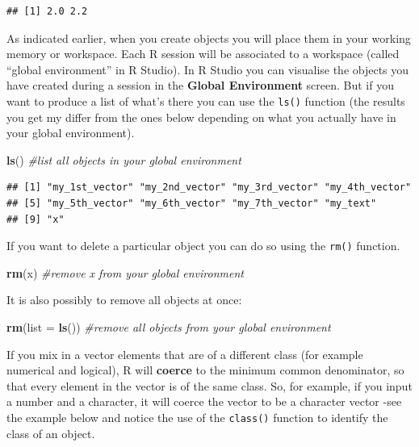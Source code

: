\documentclass[]{book}
\newenvironment{Shaded}{\begin{snugshade}}{\end{snugshade}}
\newcommand{\CommentTok}[1]{\textcolor[rgb]{0.56,0.35,0.01}{\textit{#1}}}
\newcommand{\DataTypeTok}[1]{\textcolor[rgb]{0.13,0.29,0.53}{#1}}
\newcommand{\KeywordTok}[1]{\textcolor[rgb]{0.13,0.29,0.53}{\textbf{#1}}}
\newcommand{\NormalTok}[1]{#1}
\theoremstyle{definition}
\theoremstyle{definition}
\theoremstyle{definition}
\theoremstyle{remark}
\begin{document}
\begin{verbatim}
## [1] 2.0 2.2
\end{verbatim}

As indicated earlier, when you create objects you will place them in
your working memory or workspace. Each R session will be associated to a
workspace (called ``global environment'' in R Studio). In R Studio you
can visualise the objects you have created during a session in the
\textbf{Global Environment} screen. But if you want to produce a list of
what's there you can use the \texttt{ls()} function (the results you get
my differ from the ones below depending on what you actually have in
your global environment).

\begin{Shaded}
\begin{Highlighting}[]
\KeywordTok{ls}\NormalTok{() }\CommentTok{#list all objects in your global environment}
\end{Highlighting}
\end{Shaded}

\begin{verbatim}
## [1] "my_1st_vector" "my_2nd_vector" "my_3rd_vector" "my_4th_vector"
## [5] "my_5th_vector" "my_6th_vector" "my_7th_vector" "my_text"      
## [9] "x"
\end{verbatim}

If you want to delete a particular object you can do so using the
\texttt{rm()} function.

\begin{Shaded}
\begin{Highlighting}[]
\KeywordTok{rm}\NormalTok{(x) }\CommentTok{#remove x from your global environment}
\end{Highlighting}
\end{Shaded}

It is also possibly to remove all objects at once:

\begin{Shaded}
\begin{Highlighting}[]
\KeywordTok{rm}\NormalTok{(}\DataTypeTok{list =} \KeywordTok{ls}\NormalTok{()) }\CommentTok{#remove all objects from your global environment}
\end{Highlighting}
\end{Shaded}

If you mix in a vector elements that are of a different class (for
example numerical and logical), R will \textbf{coerce} to the minimum
common denominator, so that every element in the vector is of the same
class. So, for example, if you input a number and a character, it will
coerce the vector to be a character vector -see the example below and
notice the use of the \texttt{class()} function to identify the class of
an object.
\end{document}
